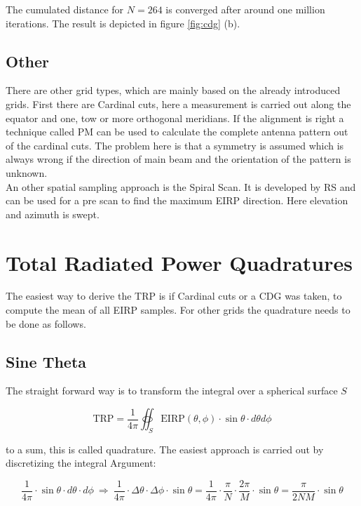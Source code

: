 The cumulated distance for $N = 264$ is converged after around one million iterations. The result is depicted in figure \ref{fig:cdg} (b).

\subsection{Other}

There are other grid types, which are mainly based on the already introduced grids. First there are Cardinal cuts, here a measurement is carried out along the equator and one, tow or more orthogonal meridians. If the alignment is right a technique called \acf{PM} can be used to calculate the complete antenna pattern out of the cardinal cuts. The problem here is that a symmetry is assumed which is always wrong if the direction of main beam and the orientation of the pattern is unknown. \cite{2018arXiv180310993F}\\
An other spatial sampling approach is the Spiral Scan. It is developed by \ac{RS} and can be used for a pre scan to find the maximum \ac{EIRP} direction. Here elevation and azimuth is swept. \cite{ctiaat}

\section{Total Radiated Power Quadratures}
\label{sec:quadrature}

The easiest way to derive the \ac{TRP} is if Cardinal cuts or a \ac{CDG} was taken, to compute the mean of all \ac{EIRP} samples. For other grids the quadrature needs to be done as follows. \cite{trp}

\subsection{Sine Theta}

The straight forward way is to transform the integral over a spherical surface $S$

\begin{equation}
\text{TRP} = \frac{1}{4\pi}  \oiint_S \text{EIRP}\left(\theta,\phi\right)\cdot\sin\theta\cdot d\theta d\phi
\label{eq:trpint}
\end{equation}

to a sum, this is called quadrature. The easiest approach is carried out by discretizing the integral Argument:  \cite{ctiaat}

\begin{equation}
\frac{1}{4\pi}\cdot\sin\theta\cdot d\theta\cdot d\phi \ \Rightarrow\ \frac{1}{4\pi}\cdot \Delta\theta\cdot \Delta\phi\cdot\sin\theta = \frac{1}{4\pi}\cdot \frac{\pi}{N}\cdot \frac{2\pi}{M}\cdot\sin\theta=\frac{\pi}{2NM}\cdot\sin\theta
\end{equation}

